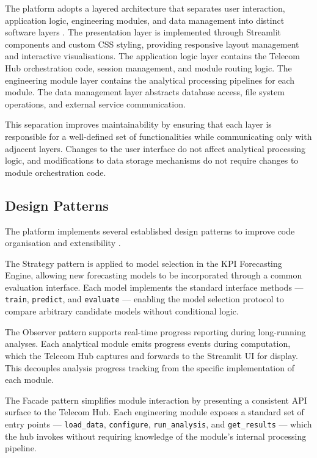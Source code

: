 The platform adopts a layered architecture that separates user interaction, application logic, engineering modules, and data management into distinct software layers \cite{sommerville2015}. The presentation layer is implemented through Streamlit components and custom CSS styling, providing responsive layout management and interactive visualisations. The application logic layer contains the Telecom Hub orchestration code, session management, and module routing logic. The engineering module layer contains the analytical processing pipelines for each module. The data management layer abstracts database access, file system operations, and external service communication.

This separation improves maintainability by ensuring that each layer is responsible for a well-defined set of functionalities while communicating only with adjacent layers. Changes to the user interface do not affect analytical processing logic, and modifications to data storage mechanisms do not require changes to module orchestration code.

\subsection{Design Patterns}

The platform implements several established design patterns to improve code organisation and extensibility \cite{gamma1994}.

The Strategy pattern is applied to model selection in the KPI Forecasting Engine, allowing new forecasting models to be incorporated through a common evaluation interface. Each model implements the standard interface methods — \texttt{train}, \texttt{predict}, and \texttt{evaluate} — enabling the model selection protocol to compare arbitrary candidate models without conditional logic.

The Observer pattern supports real-time progress reporting during long-running analyses. Each analytical module emits progress events during computation, which the Telecom Hub captures and forwards to the Streamlit UI for display. This decouples analysis progress tracking from the specific implementation of each module.

The Facade pattern simplifies module interaction by presenting a consistent API surface to the Telecom Hub. Each engineering module exposes a standard set of entry points — \texttt{load\_data}, \texttt{configure}, \texttt{run\_analysis}, and \texttt{get\_results} — which the hub invokes without requiring knowledge of the module's internal processing pipeline.

